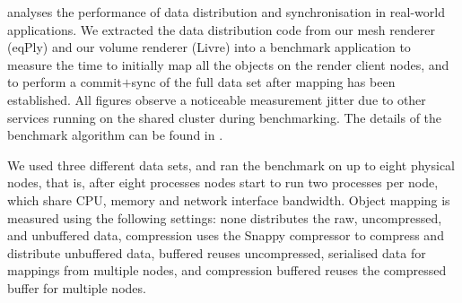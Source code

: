  analyses the performance of data distribution and
synchronisation in real-world applications. We extracted the data distribution
code from our mesh renderer (eqPly) and our volume renderer (Livre) into a
benchmark application to measure the time to initially map all the objects on
the render client nodes, and to perform a commit$+$sync of the full data set
after mapping has been established. All figures observe a noticeable
measurement jitter due to other services running on the shared cluster during
benchmarking. The details of the benchmark algorithm can be found in
\cite{ESP:18}.

We used three different data sets, and ran the benchmark on up to eight
physical nodes, that is, after eight processes nodes start to run two processes
per node, which share CPU, memory and network interface bandwidth. Object
mapping is measured using the following settings: \textsf{none} distributes the
raw, uncompressed, and unbuffered data, \textsf{compression} uses the Snappy
compressor to compress and distribute unbuffered data, \textsf{buffered} reuses
uncompressed, serialised data for mappings from multiple nodes, and
\textsf{compression buffered} reuses the compressed buffer for multiple nodes.

